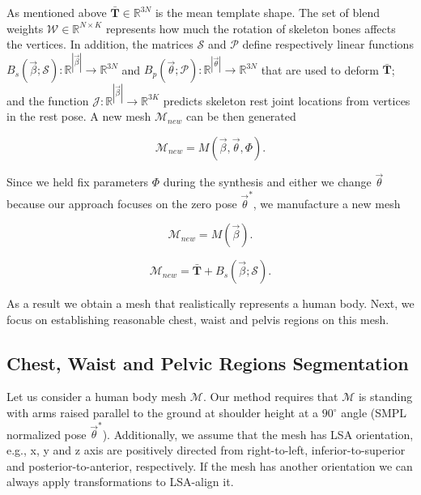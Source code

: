 \documentclass[runningheads, orivec]{llncs}
\begin{document}
As mentioned above $\mathbf{\bar{T}} \in \mathbb{R}^{3N}$  is the mean template 
shape. The set of blend weights $\mathcal{W} \in \mathbb{R}^{N \times K}$ 
represents 
how much the rotation of 
skeleton bones affects
the vertices. In addition, the matrices $\mathcal{S}$ and $\mathcal{P}$ define 
respectively linear functions $B_s(\vec{\beta}; \mathcal{S}): 
\mathbb{R}^{|\vec{\beta}|} \to 
\mathbb{R}^{3N}$ and $B_p(\vec{\theta}; \mathcal{P}): 
\mathbb{R}^{|\vec{\theta}|} \to 
\mathbb{R}^{3N}$ that are used to deform $\mathbf{\bar{T}}$; and the function 
$\mathcal{J}: \mathbb{R}^{|\vec{\beta}|} \to \mathbb{R}^{3K}$ predicts skeleton 
rest joint locations from vertices in the rest 
pose. A new mesh $\mathcal{M}_{new}$ can be then generated

\begin{equation}\label{eq:gen_mesh}
\mathcal{M}_{new} = M(\vec{\beta}, \vec{\theta}, \Phi).
\end{equation}

Since we held fix parameters $\Phi$ during the synthesis and either we change 
$\vec{\theta}$ because our approach focuses on the zero pose $\vec{\theta}^*$, 
we manufacture a new mesh

\begin{equation}\label{eq:gen_mesh_only_shape}
\mathcal{M}_{new} = M(\vec{\beta}).
\end{equation}

\begin{equation}\label{eq:gen_new_mesh}
\mathcal{M}_{new} = \mathbf{\bar{T}} + B_s(\vec{\beta}; \mathcal{S}).
\end{equation}

As a result we obtain a mesh that realistically represents a human body. Next, 
we focus on establishing reasonable chest, waist and pelvis regions on this 
mesh.

\subsection{Chest, Waist and Pelvic Regions 
Segmentation}\label{subsec:three_regions}

Let us consider a human body mesh $\mathcal{M}$. Our method requires that 
$\mathcal{M}$ is standing with arms raised 
parallel to the 
ground at shoulder height at a $90^\circ$ angle (SMPL normalized pose
$\vec{\theta}^*$). Additionally, we assume that the mesh 
has LSA orientation, e.g., x, y and z axis are positively directed from 
right-to-left, inferior-to-superior and posterior-to-anterior, respectively. If 
the mesh has another orientation we can always apply transformations to 
LSA-align it.
\end{document}
